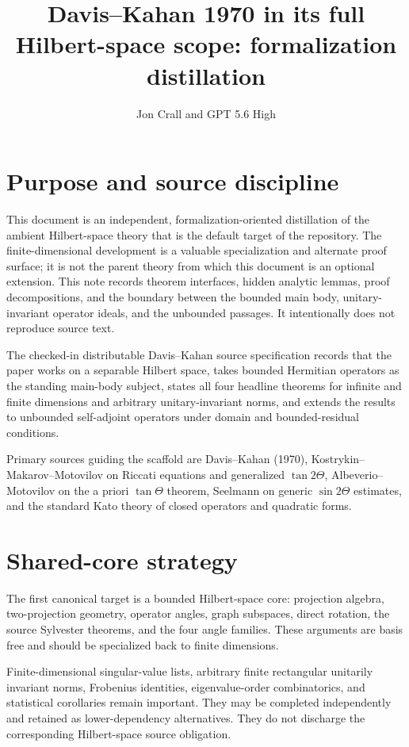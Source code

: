 \documentclass{article}
\title{Davis--Kahan 1970 in its full Hilbert-space scope: formalization distillation}
\author{Jon Crall and GPT 5.6 High}
\begin{document}
\maketitle

\section{Purpose and source discipline}
This document is an independent, formalization-oriented distillation of the
ambient Hilbert-space theory that is the default target of the repository.
The finite-dimensional development is a valuable specialization and alternate
proof surface; it is not the parent theory from which this document is an
optional extension. This note records theorem interfaces, hidden analytic
lemmas, proof decompositions, and the boundary between the bounded main body,
unitary-invariant operator ideals, and the unbounded passages. It intentionally
does not reproduce source text.

The checked-in distributable Davis--Kahan source specification records that the paper works on a
separable Hilbert space, takes bounded Hermitian operators as the standing
main-body subject, states all four headline theorems for infinite and finite
dimensions and arbitrary unitary-invariant norms, and extends the results to
unbounded self-adjoint operators under domain and bounded-residual conditions.

Primary sources guiding the scaffold are Davis--Kahan (1970),
Kostrykin--Makarov--Motovilov on Riccati equations and generalized
$\tan 2\Theta$, Albeverio--Motovilov on the a priori $\tan\Theta$ theorem,
Seelmann on generic $\sin 2\Theta$ estimates, and the standard Kato theory of
closed operators and quadratic forms.


\section{Shared-core strategy}
The first canonical target is a bounded Hilbert-space core: projection algebra,
two-projection geometry, operator angles, graph subspaces, direct rotation, the
source Sylvester theorems, and the four angle families. These arguments are
basis free and should be specialized back to finite dimensions.

Finite-dimensional singular-value lists, arbitrary finite rectangular
unitarily invariant norms, Frobenius identities, eigenvalue-order
combinatorics, and statistical corollaries remain important. They may be
completed independently and retained as lower-dependency alternatives. They do
not discharge the corresponding Hilbert-space source obligation.
\end{document}
